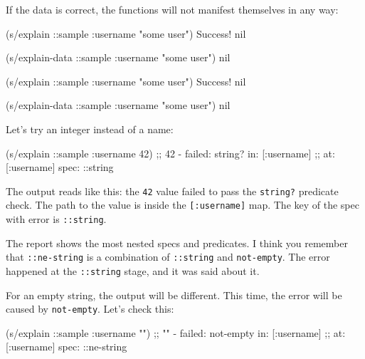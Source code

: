 \noindent
If the data is correct, the functions will not manifest themselves in any way:

\ifx\DEVICETYPE\MOBILE

\begin{english}
  \begin{clojure}
(s/explain ::sample
  {:username "some user"})
Success!
nil

(s/explain-data ::sample
  {:username "some user"})
nil
  \end{clojure}
\end{english}

\else

\begin{english}
  \begin{clojure}
(s/explain ::sample {:username "some user"})
Success!
nil

(s/explain-data ::sample {:username "some user"})
nil
  \end{clojure}
\end{english}

\fi

\noindent
Let's try an integer instead of a name:

\begin{english}
  \begin{clojure}
(s/explain ::sample {:username 42})
;; 42 - failed: string? in: [:username]
;; at: [:username] spec: ::string
  \end{clojure}
\end{english}

The output reads like this: the \verb|42| value failed to pass the \verb|string?| predicate check. The path to the value is inside the \verb|[:username]| map. The key of the spec with error is \verb|::string|.

The report shows the most nested specs and predicates. I think you remember that \verb|::ne-string| is a combination of \verb|::string| and \verb|not-empty|. The error happened at the \verb|::string| stage, and it was said about it.

For an empty string, the output will be different. This time, the error will be caused by \verb|not-empty|. Let's check this:

\begin{english}
  \begin{clojure}
(s/explain ::sample {:username ""})
;; "" - failed: not-empty in: [:username]
;; at: [:username] spec: ::ne-string
  \end{clojure}
\end{english}

